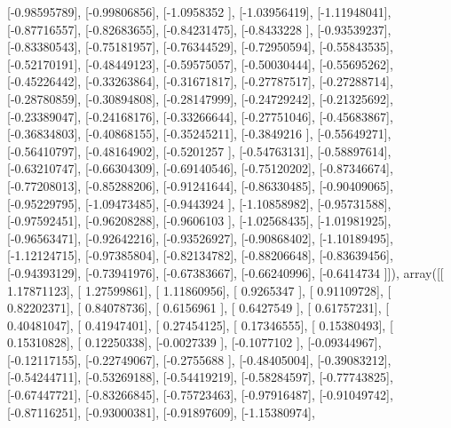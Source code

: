 \documentclass{article}
\begin{document}
       [-0.98595789],
       [-0.99806856],
       [-1.0958352 ],
       [-1.03956419],
       [-1.11948041],
       [-0.87716557],
       [-0.82683655],
       [-0.84231475],
       [-0.8433228 ],
       [-0.93539237],
       [-0.83380543],
       [-0.75181957],
       [-0.76344529],
       [-0.72950594],
       [-0.55843535],
       [-0.52170191],
       [-0.48449123],
       [-0.59575057],
       [-0.50030444],
       [-0.55695262],
       [-0.45226442],
       [-0.33263864],
       [-0.31671817],
       [-0.27787517],
       [-0.27288714],
       [-0.28780859],
       [-0.30894808],
       [-0.28147999],
       [-0.24729242],
       [-0.21325692],
       [-0.23389047],
       [-0.24168176],
       [-0.33266644],
       [-0.27751046],
       [-0.45683867],
       [-0.36834803],
       [-0.40868155],
       [-0.35245211],
       [-0.3849216 ],
       [-0.55649271],
       [-0.56410797],
       [-0.48164902],
       [-0.5201257 ],
       [-0.54763131],
       [-0.58897614],
       [-0.63210747],
       [-0.66304309],
       [-0.69140546],
       [-0.75120202],
       [-0.87346674],
       [-0.77208013],
       [-0.85288206],
       [-0.91241644],
       [-0.86330485],
       [-0.90409065],
       [-0.95229795],
       [-1.09473485],
       [-0.9443924 ],
       [-1.10858982],
       [-0.95731588],
       [-0.97592451],
       [-0.96208288],
       [-0.9606103 ],
       [-1.02568435],
       [-1.01981925],
       [-0.96563471],
       [-0.92642216],
       [-0.93526927],
       [-0.90868402],
       [-1.10189495],
       [-1.12124715],
       [-0.97385804],
       [-0.82134782],
       [-0.88206648],
       [-0.83639456],
       [-0.94393129],
       [-0.73941976],
       [-0.67383667],
       [-0.66240996],
       [-0.6414734 ]]), array([[ 1.17871123],
       [ 1.27599861],
       [ 1.11860956],
       [ 0.9265347 ],
       [ 0.91109728],
       [ 0.82202371],
       [ 0.84078736],
       [ 0.6156961 ],
       [ 0.6427549 ],
       [ 0.61757231],
       [ 0.40481047],
       [ 0.41947401],
       [ 0.27454125],
       [ 0.17346555],
       [ 0.15380493],
       [ 0.15310828],
       [ 0.12250338],
       [-0.0027339 ],
       [-0.1077102 ],
       [-0.09344967],
       [-0.12117155],
       [-0.22749067],
       [-0.2755688 ],
       [-0.48405004],
       [-0.39083212],
       [-0.54244711],
       [-0.53269188],
       [-0.54419219],
       [-0.58284597],
       [-0.77743825],
       [-0.67447721],
       [-0.83266845],
       [-0.75723463],
       [-0.97916487],
       [-0.91049742],
       [-0.87116251],
       [-0.93000381],
       [-0.91897609],
       [-1.15380974],
\end{document}
